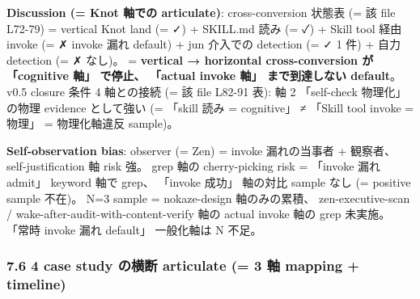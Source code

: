 \documentclass[
]{article}
\begin{document}
\textbf{Discussion (= Knot 軸での articulate)}: cross-conversion 状態表
(= 該 file L72-79) = vertical Knot land (= ✓) + SKILL.md 読み (= ✓) +
Skill tool 経由 invoke (= ✗ invoke 漏れ default) + jun 介入での
detection (= ✓ 1 件) + 自力 detection (= ✗ なし)。 = \textbf{vertical →
horizontal cross-conversion が 「cognitive 軸」 で停止、 「actual invoke
軸」 まで到達しない default}。 v0.5 closure 条件 4 軸との接続 (= 該 file
L82-91 表): 軸 2 「self-check 物理化」 の物理 evidence として強い (=
「skill 読み = cognitive」 ≠ 「Skill tool invoke = 物理」 = 物理化軸違反
sample)。

\textbf{Self-observation bias}: observer (= Zen) = invoke 漏れの当事者 +
観察者、 self-justification 軸 risk 強。 grep 軸の cherry-picking risk =
「invoke 漏れ admit」 keyword 軸で grep、 「invoke 成功」 軸の対比
sample なし (= positive sample 不在)。 N=3 sample = nokaze-design
軸のみの累積、 zen-executive-scan / wake-after-audit-with-content-verify
軸の actual invoke 軸の grep 未実施。 「常時 invoke 漏れ default」
一般化軸は N 不足。

\subsubsection{7.6 4 case study の横断 articulate (= 3 軸 mapping +
timeline)}\label{case-study-ux306eux6a2aux65ad-articulate-3-ux8ef8-mapping-timeline}
\end{document}
